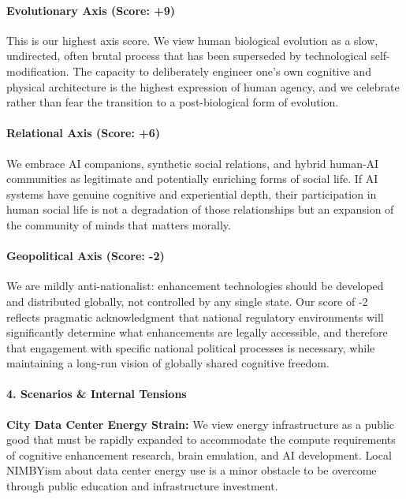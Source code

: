 \paragraph{Evolutionary Axis (Score:
+9)}\label{evolutionary-axis-score-9}

This is our highest axis score. We view human biological evolution as a
slow, undirected, often brutal process that has been superseded by
technological self-modification. The capacity to deliberately engineer
one's own cognitive and physical architecture is the highest expression
of human agency, and we celebrate rather than fear the transition to a
post-biological form of evolution.

\paragraph{Relational Axis (Score: +6)}\label{relational-axis-score-6}

We embrace AI companions, synthetic social relations, and hybrid
human-AI communities as legitimate and potentially enriching forms of
social life. If AI systems have genuine cognitive and experiential
depth, their participation in human social life is not a degradation of
those relationships but an expansion of the community of minds that
matters morally.

\paragraph{Geopolitical Axis (Score:
-2)}\label{geopolitical-axis-score--2}

We are mildly anti-nationalist: enhancement technologies should be
developed and distributed globally, not controlled by any single state.
Our score of -2 reflects pragmatic acknowledgment that national
regulatory environments will significantly determine what enhancements
are legally accessible, and therefore that engagement with specific
national political processes is necessary, while maintaining a long-run
vision of globally shared cognitive freedom.

\paragraph{4. Scenarios \& Internal
Tensions}\label{scenarios-internal-tensions-16}

\textbf{City Data Center Energy Strain:} We view energy infrastructure
as a public good that must be rapidly expanded to accommodate the
compute requirements of cognitive enhancement research, brain emulation,
and AI development. Local NIMBYism about data center energy use is a
minor obstacle to be overcome through public education and
infrastructure investment.

